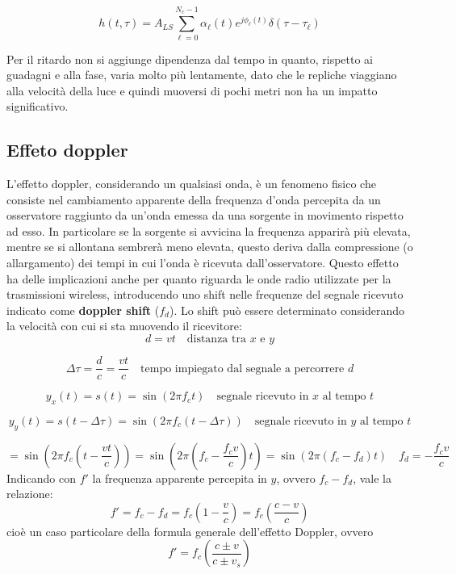 
\[
    h(t, \tau) = A_{LS} \sum_{\ell=0}^{N_c-1} \alpha_{\ell}(t) e^{j\phi_{\ell}(t)} \delta(\tau - \tau_{\ell})
\]


Per il ritardo non si aggiunge dipendenza dal tempo in quanto, rispetto ai guadagni e alla fase, varia molto più lentamente, dato che le repliche viaggiano alla velocità della luce e quindi muoversi di pochi metri non ha un impatto significativo.






\subsection*{Effeto doppler}
L'effetto doppler, considerando un qualsiasi onda, è un fenomeno fisico che consiste nel cambiamento apparente della frequenza d'onda percepita da un osservatore raggiunto da un'onda emessa da una sorgente in movimento rispetto ad esso.
In particolare se la sorgente si avvicina la frequenza apparirà più elevata, mentre se si allontana sembrerà meno elevata, questo deriva dalla compressione (o allargamento) dei tempi in cui l'onda è ricevuta dall'osservatore.
Questo effetto ha delle implicazioni anche per quanto riguarda le onde radio utilizzate per la trasmissioni wireless, introducendo uno shift nelle frequenze del segnale ricevuto indicato come \textbf{doppler shift} ($f_d$).
Lo shift può essere determinato considerando la velocità con cui si sta muovendo il ricevitore:
\[
    d = vt \quad \text{distanza tra $x$ e $y$}
\]

\[
    \Delta \tau = \frac{d}{c} = \frac{vt}{c} \quad \text{tempo impiegato dal segnale a percorrere $d$}
\]

\[
    y_x(t) = s(t) = \sin(2\pi f_c t) \quad \text{segnale ricevuto in $x$ al tempo $t$}
\]

\[
    y_y(t) = s(t-\Delta \tau) = \sin(2\pi f_c (t-\Delta \tau)) \quad \text{segnale ricevuto in $y$ al tempo $t$}
\]

\[
    = \sin\left(2\pi f_c \left(t - \frac{vt}{c}\right)\right) = \sin\left(2\pi \left(f_c - \frac{f_c v}{c}\right) t\right) = \sin\left(2\pi \left(f_c - f_d \right) t \right) \quad \boxed{f_d = -\frac{f_c v}{c}}
\]
Indicando con $f'$ la frequenza apparente percepita in $y$, ovvero $f_c - f_d$, vale la relazione:
\[
    f' = f_c - f_d = f_c \left(1 - \frac{v}{c}\right) = f_c \left( \frac{c - v}{c} \right)
\]
cioè un caso particolare della formula generale dell'effetto Doppler, ovvero
\[
    f' = f_c \left( \frac{c \pm v}{c \pm v_s} \right)
\]

